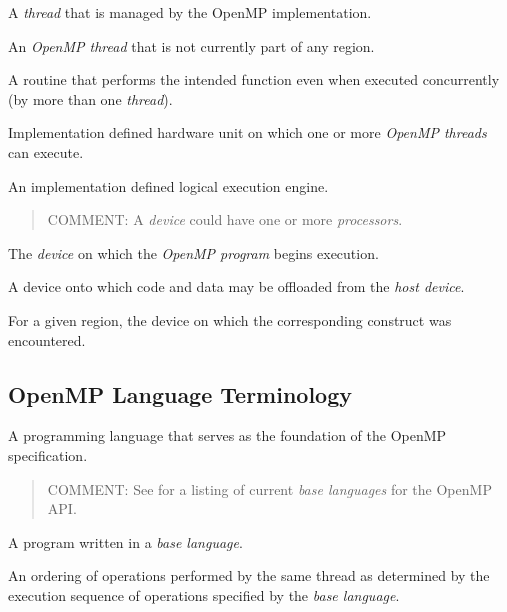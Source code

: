\glossarydefstart
A \emph{thread} that is managed by the OpenMP implementation.
\glossarydefend

\glossarydefstart
An \emph{OpenMP thread} that is not currently part of any  region.
\glossarydefend

\glossarydefstart
A routine that performs the intended function even when executed concurrently
(by more than one \emph{thread}).
\glossarydefend

\glossarydefstart
Implementation defined hardware unit on which one or more \emph{OpenMP threads} can
execute.
\glossarydefend

\glossarydefstart
An implementation defined logical execution engine.

\begin{quote}
COMMENT: A \emph{device} could have one or more \emph{processors}.
\end{quote}
\glossarydefend

\glossarydefstart
The \emph{device} on which the \emph{OpenMP program} begins execution.
\glossarydefend

\glossarydefstart
A device onto which code and data may be offloaded from the \emph{host device}.
\glossarydefend

\glossarydefstart
For a given  region, the device on which the corresponding  construct was encountered.
\glossarydefend

% 
\subsection{OpenMP Language Terminology}
\label{subsec:OpenMP Language Terminology}
\glossarydefstart
A programming language that serves as the foundation of the OpenMP
specification.

\begin{quote}
COMMENT: See 
for a listing of current \emph{base languages} for the OpenMP API.
\end{quote}
\glossarydefend

\glossarydefstart
A program written in a \emph{base language}.
\glossarydefend

\glossarydefstart
An ordering of operations performed by the same thread as determined by the
execution sequence of operations specified by the \emph{base language}.

